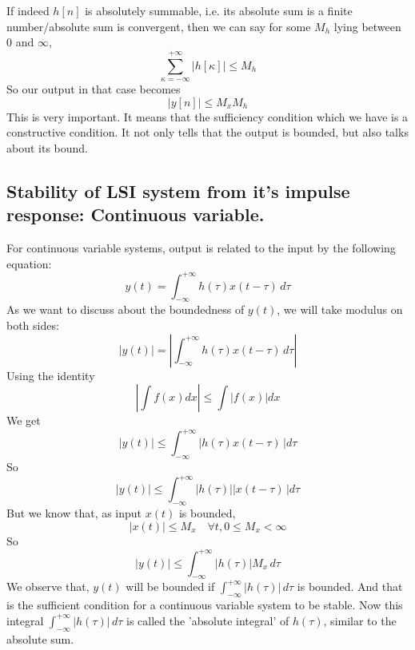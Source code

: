 If indeed $h[n]$ is absolutely summable, i.e. its absolute sum is a finite number/absolute sum is convergent, then we can say for some $ M_{h}$ lying between $0$ and $\infty$,
\begin{equation}
 \sum_{\kappa=-\infty}^{+\infty} |h[\kappa]|\le M_{h} \nonumber
\end{equation}
So our output in that case becomes
\begin{equation}
|y[n]| \le M_{x}M_{h} \nonumber
\end{equation}
This is very important. It means that the sufficiency condition which we have is a constructive condition. It not only tells that the output is bounded, but also talks about its bound.




\subsection{Stability of LSI system from it's impulse response: Continuous variable.}
 For continuous variable systems, output is related to the input by the following equation:
\begin{equation}
y(t)=\int_{-\infty}^{+\infty} h(\tau)x(t-\tau)\,d\tau \nonumber
\end{equation}
As we want to discuss about the boundedness of $y(t)$, we will take modulus on both sides:
\begin{equation}
|y(t)|=|\int_{-\infty}^{+\infty} h(\tau)x(t-\tau)\,d\tau| \nonumber
\end{equation}
Using the identity
\begin{equation}
|\int f(x) dx| \le \int|f(x)| dx \nonumber
\end{equation}
We get
\begin{equation}
|y(t)|\le\int_{-\infty}^{+\infty}| h(\tau)x(t-\tau)\,|d\tau \nonumber
\end{equation}
So
\begin{equation}
|y(t)|\le\int_{-\infty}^{+\infty}| h(\tau)||x(t-\tau)\,|d\tau \nonumber
\end{equation}
But we know that, as input $x(t)$ is bounded,
\begin{equation}
|x(t)| \le M_{x} \quad \forall t, 0 \le M_{x}< \infty \nonumber
\end{equation}
So 
\begin{equation}
|y(t)|\le\int_{-\infty}^{+\infty}| h(\tau)|M_{x}\,d\tau \nonumber
\end{equation}
We observe that, $y(t)$ will be bounded if $\int_{-\infty}^{+\infty}| h(\tau)|\,d\tau$ is bounded. And that is the sufficient condition for a continuous variable system to be stable. Now this integral $\int_{-\infty}^{+\infty}| h(\tau)|\,d\tau$ is called the 'absolute integral' of $h(\tau)$, similar to the absolute sum.\\
